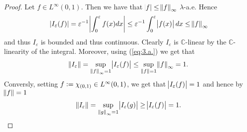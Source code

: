\begin{enumerate}[label = \textbf{Exercise \arabic*.},wide = 0pt, itemsep = 1.5ex]
\begin{enumerate}[label = \textbf{\alph*.},wide = 0pt, itemsep = 1.5ex]
				\begin{proof}
					 Let $f \in L^\infty(0,1)$. Then we have that $\abs{f} \leq \norm{f}_\infty$ $\lambda$-a.e. Hence 
					 \begin{equation}
						 \abs[0]{I_\varepsilon(f)} = \varepsilon^{-1} \abs[3]{\int_0^\varepsilon f(x) dx} \leq \varepsilon^{-1} \int_0^\varepsilon \abs{f(x)}dx \leq \norm{f}_\infty
						 \label{eq:3.a.}
					 \end{equation}
					 \noindent and thus $I_\varepsilon$ is bounded and thus continuous. Clearly $I_\varepsilon$ is $\mathbb{C}$-linear by the $\mathbb{C}$-linearity of the integral. Moreover, using (\ref{eq:3.a.}) we get that
					 \begin{equation*}
						 \norm{I_\varepsilon} = \sup_{\norm[0]{f}_\infty = 1}\abs{I_\varepsilon(f)} \leq \sup_{\norm[0]{f} = 1}\norm{f}_\infty = 1.
					 \end{equation*}
					 Conversly, setting $f := \chi_{\intoo{0,1}} \in L^\infty(0,1)$, we get that $\abs{I_\varepsilon(f)} = 1$ and hence by $\norm{f} = 1$
					 \begin{equation*}
						 \norm{I_\varepsilon} = \sup_{\norm[0]{g}_\infty = 1} \abs{I_\varepsilon(g)} \geq \abs{I_\varepsilon(f)} = 1. 
					 \end{equation*}
				\end{proof}
		\end{enumerate}


\end{enumerate}
